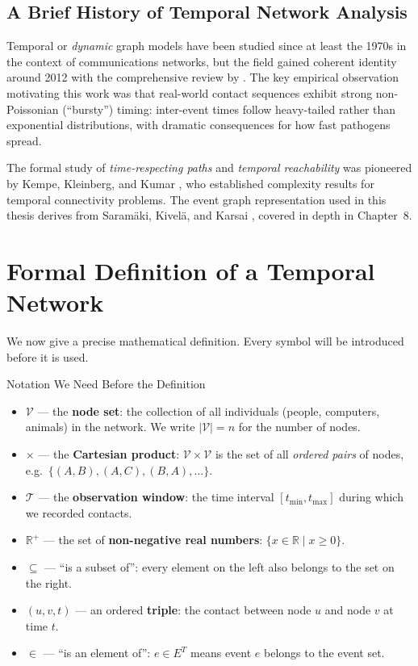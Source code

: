 \subsection{A Brief History of Temporal Network Analysis}

Temporal or \textit{dynamic} graph models have been studied since at least the 1970s in the
context of communications networks, but the field gained coherent identity around 2012 with the
comprehensive review by \cite{holme2012temporal}. The key empirical observation motivating this
work was that real-world contact sequences exhibit strong non-Poissonian (``bursty'') timing:
inter-event times follow heavy-tailed rather than exponential distributions, with dramatic
consequences for how fast pathogens spread.

The formal study of \textit{time-respecting paths} and \textit{temporal reachability} was
pioneered by Kempe, Kleinberg, and Kumar \cite{kempe2000connectivity}, who established
complexity results for temporal connectivity problems. The event graph representation used in
this thesis derives from Saram\"{a}ki, Kivel\"{a}, and Karsai \cite{saramaki2019temporal},
covered in depth in Chapter~8.

\section{Formal Definition of a Temporal Network}
\label{sec:tn_definition}

We now give a precise mathematical definition. Every symbol will be introduced before it is
used.

\begin{conceptbox}{Notation We Need Before the Definition}
\begin{itemize}[noitemsep]
  \item $\mathcal{V}$ --- the \textbf{node set}: the collection of all individuals (people,
        computers, animals) in the network. We write $|\mathcal{V}| = n$ for the number of
        nodes.
  \item $\times$ --- the \textbf{Cartesian product}: $\mathcal{V} \times \mathcal{V}$ is the
        set of all \emph{ordered pairs} of nodes, e.g.\ $\{(A,B), (A,C), (B,A), \ldots\}$.
  \item $\mathcal{T}$ --- the \textbf{observation window}: the time interval $[t_{\min},
        t_{\max}]$ during which we recorded contacts.
  \item $\mathbb{R}^+$ --- the set of \textbf{non-negative real numbers}: $\{x \in \mathbb{R}
        \mid x \geq 0\}$.
  \item $\subseteq$ --- ``is a subset of'': every element on the left also belongs to the set
        on the right.
  \item $(u, v, t)$ --- an ordered \textbf{triple}: the contact between node $u$ and node $v$
        at time $t$.
  \item $\in$ --- ``is an element of'': $e \in E^T$ means event $e$ belongs to the event set.
\end{itemize}
\end{conceptbox}

